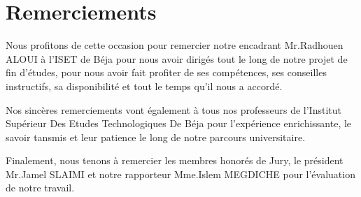 \chapter*{Remerciements}



Nous profitons de cette occasion pour remercier notre encadrant Mr.Radhouen ALOUI à l'ISET de Béja pour nous avoir dirigés tout le long de notre projet de fin d'études, pour nous avoir fait profiter de ses compétences, ses conseilles instructifs, sa disponibilité et tout le temps qu'il nous a accordé.

Nos sincères remerciements vont également à tous nos professeurs de l'Institut Supérieur Des Etudes Technologiques De Béja pour l'expérience enrichissante, le savoir tansmis et leur patience le long de notre parcours universitaire.

Finalement, nous tenons à remercier les membres honorés de Jury, le président Mr.Jamel SLAIMI et notre rapporteur Mme.Islem MEGDICHE pour l'évaluation de notre travail.
